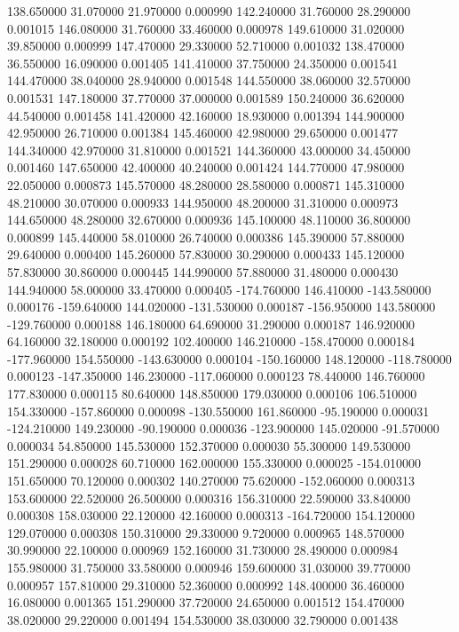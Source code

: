 138.650000 31.070000 21.970000 0.000990 
142.240000 31.760000 28.290000 0.001015 
146.080000 31.760000 33.460000 0.000978 
149.610000 31.020000 39.850000 0.000999 
147.470000 29.330000 52.710000 0.001032 
138.470000 36.550000 16.090000 0.001405 
141.410000 37.750000 24.350000 0.001541 
144.470000 38.040000 28.940000 0.001548 
144.550000 38.060000 32.570000 0.001531 
147.180000 37.770000 37.000000 0.001589 
150.240000 36.620000 44.540000 0.001458 
141.420000 42.160000 18.930000 0.001394 
144.900000 42.950000 26.710000 0.001384 
145.460000 42.980000 29.650000 0.001477 
144.340000 42.970000 31.810000 0.001521 
144.360000 43.000000 34.450000 0.001460 
147.650000 42.400000 40.240000 0.001424 
144.770000 47.980000 22.050000 0.000873 
145.570000 48.280000 28.580000 0.000871 
145.310000 48.210000 30.070000 0.000933 
144.950000 48.200000 31.310000 0.000973 
144.650000 48.280000 32.670000 0.000936 
145.100000 48.110000 36.800000 0.000899 
145.440000 58.010000 26.740000 0.000386 
145.390000 57.880000 29.640000 0.000400 
145.260000 57.830000 30.290000 0.000433 
145.120000 57.830000 30.860000 0.000445 
144.990000 57.880000 31.480000 0.000430 
144.940000 58.000000 33.470000 0.000405 
-174.760000 146.410000 -143.580000 0.000176 
-159.640000 144.020000 -131.530000 0.000187 
-156.950000 143.580000 -129.760000 0.000188 
146.180000 64.690000 31.290000 0.000187 
146.920000 64.160000 32.180000 0.000192 
102.400000 146.210000 -158.470000 0.000184 
-177.960000 154.550000 -143.630000 0.000104 
-150.160000 148.120000 -118.780000 0.000123 
-147.350000 146.230000 -117.060000 0.000123 
78.440000 146.760000 177.830000 0.000115 
80.640000 148.850000 179.030000 0.000106 
106.510000 154.330000 -157.860000 0.000098 
-130.550000 161.860000 -95.190000 0.000031 
-124.210000 149.230000 -90.190000 0.000036 
-123.900000 145.020000 -91.570000 0.000034 
54.850000 145.530000 152.370000 0.000030 
55.300000 149.530000 151.290000 0.000028 
60.710000 162.000000 155.330000 0.000025 
-154.010000 151.650000 70.120000 0.000302 
140.270000 75.620000 -152.060000 0.000313 
153.600000 22.520000 26.500000 0.000316 
156.310000 22.590000 33.840000 0.000308 
158.030000 22.120000 42.160000 0.000313 
-164.720000 154.120000 129.070000 0.000308 
150.310000 29.330000 9.720000 0.000965 
148.570000 30.990000 22.100000 0.000969 
152.160000 31.730000 28.490000 0.000984 
155.980000 31.750000 33.580000 0.000946 
159.600000 31.030000 39.770000 0.000957 
157.810000 29.310000 52.360000 0.000992 
148.400000 36.460000 16.080000 0.001365 
151.290000 37.720000 24.650000 0.001512 
154.470000 38.020000 29.220000 0.001494 
154.530000 38.030000 32.790000 0.001438 
